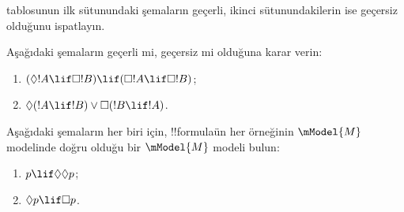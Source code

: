 \begin{prob}%
   tablosunun ilk
  sütunundaki şemaların geçerli, ikinci sütunundakilerin ise geçersiz
  olduğunu ispatlayın.
\end{prob}

\begin{prob}
  Aşağıdaki şemaların geçerli mi, geçersiz mi olduğuna karar verin:
  \begin{enumerate}
  \item $(\Diamond !A \lif \Box !B) \lif (\Box !A \lif \Box
    !B)$;
  \item $\Diamond(!A \lif !B) \lor \Box(!B \lif !A)$.
  \end{enumerate}
\end{prob}

\begin{prob}
  Aşağıdaki şemaların her biri için, !!{formula}{}ün her örneğinin
  $\mModel{M}$ modelinde doğru olduğu bir $\mModel{M}$ modeli bulun:
  \begin{enumerate}
  \item $p \lif \Diamond\Diamond p$;
  \item $\Diamond p \lif \Box p$.
  \end{enumerate}
\end{prob}

